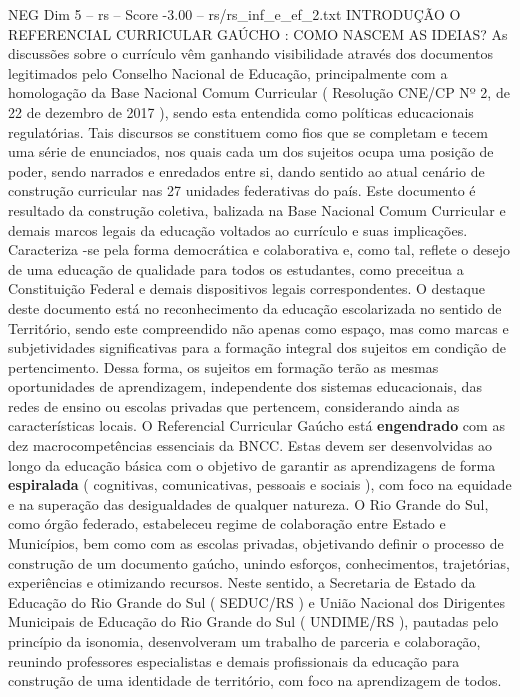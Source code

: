 \begin{textsample}{NEG Dim 5 – rs – Score -3.00 – rs/rs\_inf\_e\_ef\_2.txt}  \label{ex:f5_neg_021}
INTRODUÇÃO O REFERENCIAL CURRICULAR GAÚCHO : COMO NASCEM AS IDEIAS?
As discussões sobre o currículo vêm ganhando visibilidade através dos documentos legitimados pelo Conselho Nacional de Educação, principalmente com a homologação da Base Nacional Comum Curricular ( Resolução CNE/CP Nº 2, de 22 de dezembro de 2017 ), sendo esta entendida como políticas educacionais regulatórias.
Tais discursos se constituem como fios que se completam e tecem uma série de enunciados, nos quais cada um dos sujeitos ocupa uma posição de poder, sendo narrados e enredados entre si, dando sentido ao atual cenário de construção curricular nas 27 unidades federativas do país.
Este documento é resultado da construção coletiva, balizada na Base Nacional Comum Curricular e demais marcos legais da educação voltados ao currículo e suas implicações.
Caracteriza -se pela forma democrática e colaborativa e, como tal, reflete o desejo de uma educação de qualidade para todos os estudantes, como preceitua a Constituição Federal e demais dispositivos legais correspondentes.
O destaque deste documento está no reconhecimento da educação escolarizada no sentido de Território, sendo este compreendido não apenas como espaço, mas como marcas e subjetividades significativas para a formação integral dos sujeitos em condição de pertencimento.
Dessa forma, os sujeitos em formação terão as mesmas oportunidades de aprendizagem, independente dos sistemas educacionais, das redes de ensino ou escolas privadas que pertencem, considerando ainda as características locais.
O Referencial Curricular Gaúcho está \textbf{engendrado} com as dez macrocompetências essenciais da BNCC.
Estas devem ser desenvolvidas ao longo da educação básica com o objetivo de garantir as aprendizagens de forma \textbf{espiralada} ( cognitivas, comunicativas, pessoais e sociais ), com foco na equidade e na superação das desigualdades de qualquer natureza.
O Rio Grande do Sul, como órgão federado, estabeleceu regime de colaboração entre Estado e Municípios, bem como com as escolas privadas, objetivando definir o processo de construção de um documento gaúcho, unindo esforços, conhecimentos, trajetórias, experiências e otimizando recursos.
Neste sentido, a Secretaria de Estado da Educação do Rio Grande do Sul ( SEDUC/RS ) e União Nacional dos Dirigentes Municipais de Educação do Rio Grande do Sul ( UNDIME/RS ), pautadas pelo princípio da isonomia, desenvolveram um trabalho de parceria e colaboração, reunindo professores especialistas e demais profissionais da educação para construção de uma identidade de território, com foco na aprendizagem de todos.

\end{textsample}
